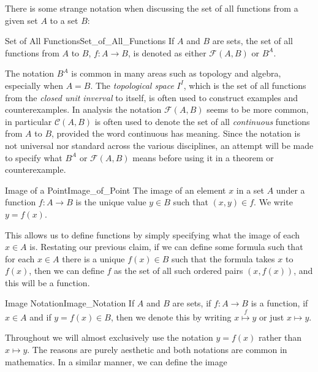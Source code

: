         There is some strange notation when discussing the set of all functions
        from a given set $A$ to a set $B$:
        \begin{fnotation}{Set of All Functions}{Set_of_All_Functions}
            If $A$ and $B$ are sets, the set of all functions from $A$ to $B$,
            $f:A\rightarrow{B}$, is denoted as either $\mathcal{F}(A,B)$ or
            $B^{A}$.
        \end{fnotation}
        The notation $B^{A}$ is common in many areas such as topology and
        algebra, especially when $A=B$. The \textit{topological space} $I^{I}$,
        which is the set of all functions from the \textit{closed unit inverval}
        to itself, is often used to construct examples and counterexamples.
        In analysis the notation $\mathcal{F}(A,B)$ seems to be more common,
        in particular $\mathcal{C}(A,B)$ is often used to denote the set of all
        \textit{continuous} functions from $A$ to $B$, provided the word
        continuous has meaning. Since the notation is not universal nor standard
        across the various disciplines, an attempt will be made to specify what
        $B^{A}$ or $\mathcal{F}(A,B)$ means before using it in a theorem or
        counterexample.
        \begin{fdefinition}{Image of a Point}{Image_of_Point}
            The image of an element $x$ in a set $A$ under a function
            $f:A\rightarrow{B}$ is the unique value $y\in{B}$ such that
            $(x,y)\in{f}$. We write $y=f(x)$.
        \end{fdefinition}
        This allows us to define functions by simply specifying what the
        image of each $x\in{A}$ is. Restating our previous claim, if we can
        define some formula such that for each $x\in{A}$ there is a unique
        $f(x)\in{B}$ such that the formula takes $x$ to $f(x)$, then we can
        define $f$ as the set of all such ordered pairs $(x,f(x))$, and this
        will be a function.
        \begin{fnotation}{Image Notation}{Image_Notation}
            If $A$ and $B$ are sets, if $f:A\rightarrow{B}$ is a function,
            if $x\in{A}$ and if $y=f(x)\in{B}$, then we denote this by
            writing $x\overset{f}{\longmapsto}{y}$ or just $x\mapsto{y}$.
        \end{fnotation}
        Throughout we will almost exclusively use the notation $y=f(x)$ rather
        than $x\mapsto{y}$. The reasons are purely aesthetic and both notations
        are common in mathematics. In a similar manner, we can define the image
